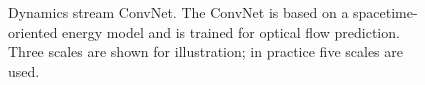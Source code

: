 \begin{figure}[t]
\begin{center}
\end{center}
\vspace{-0.45cm}
\caption[Dynamics stream ConvNet.]{Dynamics stream ConvNet. The ConvNet is based on a
spacetime-oriented energy model
\cite{derpanis2012spacetime, simoncelli1998} and is trained
for optical flow prediction.
Three scales are shown for illustration;
in practice five scales are used.}
\label{fig:MSOE}
\end{figure}